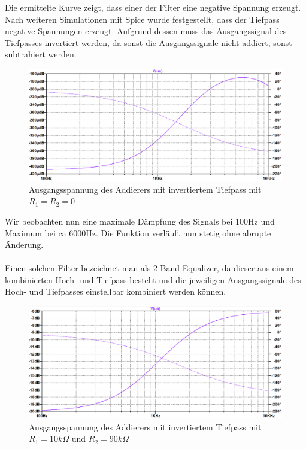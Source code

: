 \newpage
Die ermittelte Kurve zeigt, dass einer der Filter eine negative Spannung erzeugt. Nach weiteren Simulationen mit Spice wurde festgestellt, dass der Tiefpass negative Spannungen erzeugt. Aufgrund dessen muss das Ausgangssignal des Tiefpasses invertiert werden, da sonst die Ausgangssignale nicht addiert, sonst subtrahiert werden.

\begin{figure}[htb]
    \includegraphics[width=16cm]{./pictures/Gesamtschaltung_Invertiert}
    \caption{Ausgangsspannung des Addierers mit invertiertem Tiefpass mit $R_1 = R_2 = 0$}
    \label{fig:AddiererAusgangsspannungInvertiert}
\end{figure}

Wir beobachten nun eine maximale Dämpfung des Signals bei 100Hz und Maximum bei ca 6000Hz. Die Funktion verläuft nun stetig ohne abrupte Änderung.
\\
\\
Einen solchen Filter bezeichnet man als 2-Band-Equalizer, da dieser aus einem kombinierten Hoch- und Tiefpass besteht und die jeweiligen Ausgangssignale des Hoch- und Tiefpasses einstellbar kombiniert werden können.

\begin{figure}[htb]
    \includegraphics[width=16cm]{./pictures/Gesamtschaltung_Invertiert_10_90}
    \caption{Ausgangsspannung des Addierers mit invertiertem Tiefpass mit $R_1 = 10k\Omega$ und $R_2 = 90k\Omega$}
    \label{fig:AddiererAusgangsspannungInvertiert}
\end{figure}

